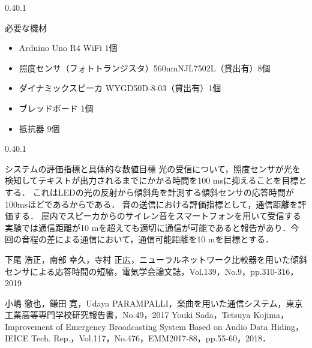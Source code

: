 \documentclass[a4j,11pt,dvipdfmx]{jsarticle}
\makeatletter
\renewcommand{\section}{%
    \@startsection{section}{1}{\z@}%
    {0.4\Cvs}{0.1\Cvs}%
    {\normalfont\headfont\raggedright}}
\makeatother
\begin{document}
\section{必要な機材}\label{sec:equipment}
\begin{itemize}
  \item Arduino Uno R4 WiFi 1個
  \item 照度センサ（フォトトランジスタ）560nmNJL7502L（貸出有）8個
  \item ダイナミックスピーカ WYGD50D-8-03（貸出有）1個
  \item ブレッドボード 1個
  \item 抵抗器 9個
\end{itemize}
\section{システムの評価指標と具体的な数値目標}\label{sec:evaluation}
光の受信について，照度センサが光を検知してテキストが出力されるまでにかかる時間を100 msに抑えることを目標とする．
これはLEDの光の反射から傾斜角を計測する傾斜センサの応答時間が100msほどであるからである\cite{ref:keisha}．
音の送信における評価指標として，通信距離を評価する．
屋内でスピーカからのサイレン音をスマートフォンを用いて受信する実験では通信距離が10 mを超えても適切に通信が可能であると報告があり．今回の音程の差による通信において，通信可能距離を10 mを目標とする．

\begin{thebibliography}{99}


  下尾 浩正，南部 幸久，寺村 正広，ニューラルネットワーク比較器を用いた傾斜センサによる応答時間の短縮，電気学会論文誌，Vol.139，No.9，pp.310-316，2019

  小嶋 徹也，鎌田 寛，Udaya PARAMPALLI，楽曲を用いた通信システム，東京工業高等専門学校研究報告書，No.49，2017
  Youki Sada，Tetsuya Kojima，Improvement of Emergency Broadcasting System Based on Audio Data Hiding，IEICE Tech. Rep.，Vol.117，No.476，EMM2017-88，pp.55-60，2018．
\end{thebibliography}
\end{document}
